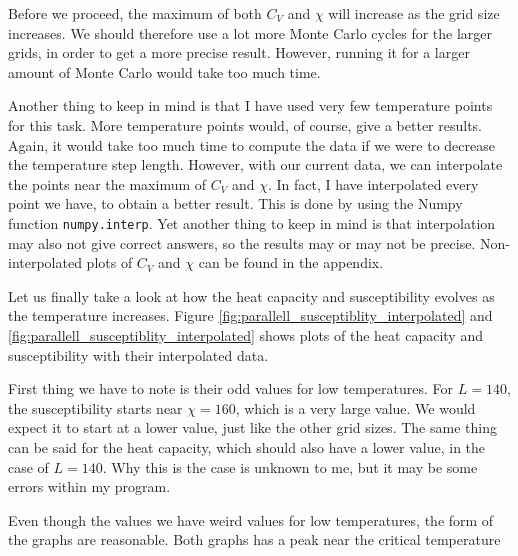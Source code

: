 \documentclass[12pt]{article}
\begin{document}

Before we proceed, the maximum of both $C_V$ and $\chi$ will increase as the grid size increases. We should therefore use a lot more Monte Carlo cycles for the larger grids, in order to get a more precise result. However, running it for a larger amount of Monte Carlo would take too much time.

Another thing to keep in mind is that I have used very few temperature points for this task. More temperature points would, of course, give a better results. Again, it would take too much time to compute the data if we were to decrease the temperature step length. However, with our current data, we can interpolate the points near the maximum of $C_V$ and $\chi$. In fact, I have interpolated every point we have, to obtain a better result. This is done by using the Numpy function \texttt{numpy.interp}. Yet another thing to keep in mind is that interpolation may also not give correct answers, so the results may or may not be precise. Non-interpolated plots of $C_V$ and $\chi$ can be found in the appendix.

Let us finally take a look at how the heat capacity and susceptibility evolves as the temperature increases. Figure \ref{fig:parallell_susceptiblity_interpolated} and \ref{fig:parallell_susceptiblity_interpolated} shows plots of the heat capacity and susceptibility with their interpolated data. 

First thing we have to note is their odd values for low temperatures. For $L=140$, the susceptibility  starts near $\chi = 160$, which is a very large value. We would expect it to start at a lower value, just like the other grid sizes. The same thing can be said for the heat capacity, which should also have a lower value, in the case of $L=140$. Why this is the case is unknown to me, but it may be some errors within my program.

Even though the values we have weird values for low temperatures, the form of the graphs are reasonable. Both graphs has a peak near the critical temperature
\end{document}
